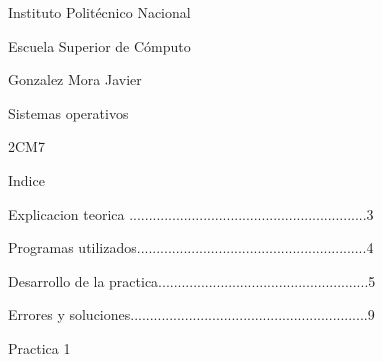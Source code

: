 \documentclass[12pt, a4paper]{report}
\begin{document}
\begin{LARGE}
\begin{center}

Instituto Politécnico Nacional

\bigskip
\bigskip

Escuela Superior de Cómputo

\bigskip
\bigskip

Gonzalez Mora Javier

\bigskip
\bigskip

Sistemas operativos

\bigskip
\bigskip

2CM7


\end{center}
\end{LARGE}

\newpage

\begin{center}

Indice

\end{center}

\bigskip
\bigskip

\begin{flushleft}
Explicacion teorica .............................................................3

\bigskip

Programas utilizados...........................................................4

\bigskip

Desarrollo de la practica......................................................5

\bigskip

Errores y soluciones.............................................................9

\bigskip

\end{flushleft}

\bigskip
\bigskip

\bigskip

\newpage




\begin{center}

Practica 1

\end{center}
\end{document}
